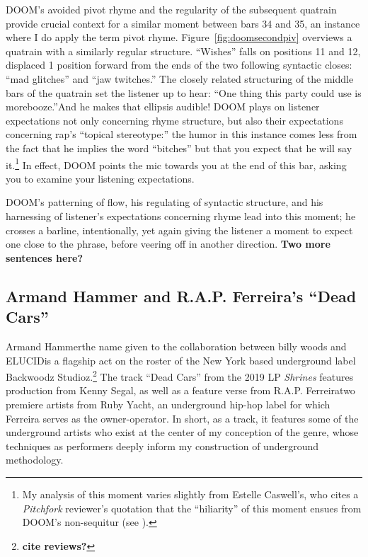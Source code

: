 DOOM's avoided pivot rhyme and the regularity of the subsequent quatrain provide crucial 
context for a similar moment between bars 34 and 35, an instance where I do apply the term
pivot rhyme. Figure~\ref{fig:doomsecondpiv} overviews a quatrain with a similarly regular
structure. ``Wishes''  falls on positions 11 and 12, displaced 1 position forward from the
ends of the two following  syntactic  closes: ``mad glitches'' and ``jaw twitches.'' The 
closely related structuring of the  middle bars of the quatrain set the listener up to hear:
``One thing this party could use is more\textellipsis booze.''And he makes that ellipsis 
audible! DOOM plays on listener expectations not only concerning rhyme structure, but also
their expectations concerning rap's ``topical stereotype:'' the humor in this instance
comes less from the fact that he implies the word ``bitches'' but that you expect that he
will say it.\footnote{
    My analysis of this moment varies slightly from Estelle Caswell's, who cites a 
    \textit{Pitchfork} reviewer's quotation that the ``hiliarity'' of this moment ensues
    from DOOM's non-sequitur (see \cite{estellecaswellRappingDeconstructedBest2016}).}
In effect, DOOM points the mic towards you at the end of this bar, asking you to examine
your listening expectations.

DOOM's patterning of flow, his regulating of syntactic structure, and his harnessing of
listener's expectations concerning rhyme lead into this moment; he crosses a barline, 
intentionally, yet again giving the listener a moment to expect one close to the phrase, 
before veering off in another direction. \textbf{Two more sentences here?}

{}
\subsection*{\centering Armand Hammer and R.A.P. Ferreira's ``Dead Cars''}

Armand Hammer\textemdash the name given to the collaboration between billy woods and
ELUCID\textemdash is a flagship act on the roster of the New York based underground 
label Backwoodz Studioz.\footnote{
    \textbf{cite reviews?}}
The track ``Dead Cars'' from the 2019 LP \textit{Shrines} features production from 
Kenny Segal, as well as a feature verse from R.A.P. Ferreira\textemdash two premiere 
artists from Ruby Yacht, an underground hip-hop label for which Ferreira serves as 
the owner-operator. In short, as a track, it features some of the underground artists
who exist at the center of my conception of the genre, whose techniques as performers
deeply inform my construction of underground methodology.

